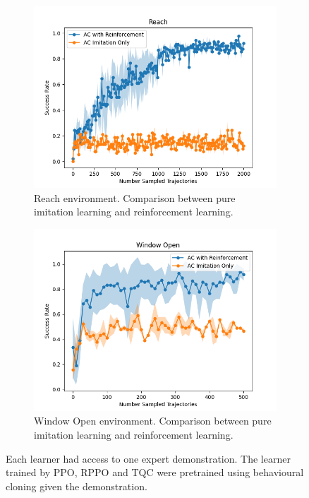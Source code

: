 \begin{figure}[htbp]
\begin{subfigure}[b]{0.45\textwidth}
      \includegraphics[width=\textwidth]{images/1_2000_imi/Reach.png}
      \caption{Reach environment. Comparison between pure imitation learning and reinforcement learning.}
      \label{fig:plot3}
    \end{subfigure}
    \hfill
    \begin{subfigure}[b]{0.45\textwidth}
      \includegraphics[width=\textwidth]{images/1_2000_imi/Window Open.png}
      \caption{Window Open environment. Comparison between pure imitation learning and reinforcement learning.}
      \label{fig:plot4}
    \end{subfigure}
    \caption{Each learner had access to one expert demonstration. 
    The learner trained by PPO, RPPO and TQC were pretrained using behavioural cloning given the demonstration. 
}
\end{figure}
